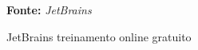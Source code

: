 \begin{figure}[h!]
\centering

\caption{\textmd{JetBrains treinamento online gratuito}}
\label{fig:onlinetraining}

\par\medskip\textbf{Fonte:} \textit{JetBrains} \par\medskip
\end{figure}
